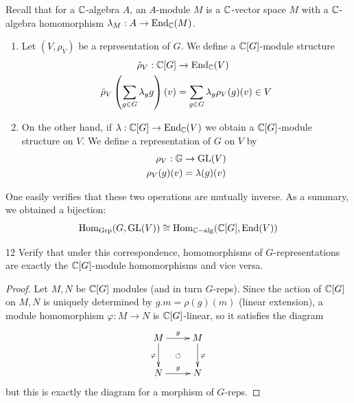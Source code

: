 \documentclass[twoside = false,	%
		headsepline,		%
		parskip = true,
		]{scrbook}						%
\begin{document}
        Recall that for a $\mathbb C$-algebra $A$, an $A$-module $M$ is a $\mathbb C$-vector space $M$ with a $\mathbb C$-algebra homomorphism $\lambda_M: A \to \mathrm{End}_\mathbb C(M)$.
        \begin{enumerate}
            \item Let $(V,\rho_V)$ be a representation of $G$. We define a $\mathbb C[G]$-module structure
            \begin{equation*}
            \begin{split}
                \tilde{\rho}_V: \mathbb C[G] &\to \mathrm{End}_\mathbb C(V) \\
                                \tilde{\rho}_V\left( \sum_{g \in G} \lambda_g g\right)(v) &= \sum_{g \in G} \lambda_g \rho_V(g)(v) \in V
            \end{split}
            \end{equation*}
            \item On the other hand, if $\lambda: \mathbb C[G] \to \mathrm{End}_\mathbb C(V)$ we obtain a $\mathbb C[G]$-module structure on $V$. We define a representation of $G$ on $V$ by
            \begin{equation*}
            \begin{split}
                \rho_V: \mathbb G &\to \mathrm{GL}(V) \\  
                        \rho_V(g)(v) &= \lambda(g)(v)
            \end{split}
            \end{equation*}
        \end{enumerate}
        One easily verifies that these two operations are mutually inverse. As a summary, we obtained a bijection:
        \begin{equation*}
            \mathrm{Hom}_{\mathrm{Grp}}(G,\mathrm{GL}(V)) \cong \mathrm{Hom}_{\mathbb C\mathrm{-alg}}(\mathbb C[G],\mathrm{End}(V))
        \end{equation*}
        \begin{exercise}{}{12}
            Verify that under this correspondence, homomorphisms of $G$-representations are exactly the $\mathbb C[G]$-module homomorphisms and vice versa.
        \end{exercise}
        \begin{proof}
            Let $M,N$ be $\mathbb C[G]$ modules (and in turn $G$-reps). Since the action of $\mathbb C[G]$ on $M, N$ is uniquely determined by $g.m = \rho(g)(m)$ (linear extension), a module homomorphism $\varphi: M \to N$ is $\mathbb C[G]$-linear, so it satisfies the diagram
            \begin{equation*}
            \xymatrix {
                M\ar[d]_{\varphi} \ar[r]^{g} & M \ar[d]^{\varphi} \\
                N \ar[r]^{g}& N\ar@{}|{\circlearrowleft}[ul]
            }
            \end{equation*}
            but this is exactly the diagram for a morphism of $G$-reps.
        \end{proof}
\end{document}
